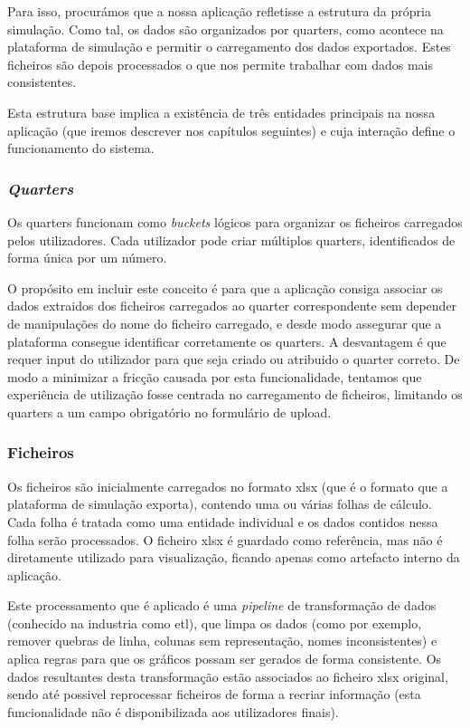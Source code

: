 Para isso, procurámos que a nossa aplicação refletisse a estrutura da própria simulação. Como tal, os dados são organizados por quarters, como acontece na plataforma de simulação e permitir o carregamento dos dados exportados. Estes ficheiros são depois processados o que nos permite trabalhar com dados mais consistentes. 

Esta estrutura base implica a existência de três entidades principais na nossa aplicação (que iremos descrever nos capítulos seguintes) e cuja interação define o funcionamento do sistema.


\subsubsection{\textit{Quarters}}
Os quarters funcionam como \textit{buckets} lógicos para organizar os ficheiros carregados pelos utilizadores. Cada utilizador pode criar múltiplos quarters, identificados de forma única por um número.

O propósito em incluir este conceito é para que a aplicação consiga associar os dados extraidos dos ficheiros carregados ao quarter correspondente sem depender de manipulações do nome do ficheiro carregado, e desde modo assegurar que a plataforma consegue identificar corretamente os quarters. A desvantagem é que requer input do utilizador para que seja criado ou atribuido o quarter correto. De modo a minimizar a fricção causada por esta funcionalidade, tentamos que experiência de utilização fosse centrada no carregamento de ficheiros, limitando os quarters a um campo obrigatório no formulário de upload.

\subsubsection{Ficheiros}

Os ficheiros são inicialmente carregados no formato \gls{xlsx} (que é o formato que a plataforma de simulação exporta), contendo uma ou várias folhas de cálculo. Cada folha é tratada como uma entidade individual e os dados contidos nessa folha serão processados. O ficheiro \gls{xlsx} é guardado como referência, mas não é diretamente utilizado para visualização, ficando apenas como artefacto interno da aplicação.

Este processamento que é aplicado é uma \textit{pipeline} de transformação de dados (conhecido na industria como \gls{etl}), que limpa os dados (como por exemplo, remover quebras de linha, colunas sem representação, nomes inconsistentes) e aplica regras para que os gráficos possam ser gerados de forma consistente. Os dados resultantes desta transformação estão associados ao ficheiro \gls{xlsx} original, sendo até possivel reprocessar ficheiros de forma a recriar informação (esta funcionalidade não é disponibilizada aos utilizadores finais).

